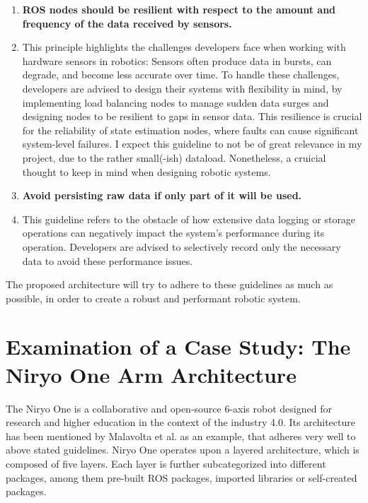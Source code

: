 \documentclass[%
paper=A4,               %
twoside=true,           %
openright,              %
11pt,                   %
bibliography=totoc,     %
titlepage=on,           %
DIV=12,                 %
BCOR=1.5cm,             %
parskip=half,            %
final
]{scrreprt}
\begin{document}
\begin{enumerate}[leftmargin=9mm, align=left]
		\item \textbf{ROS nodes should be resilient with respect to the amount and frequency of the data received by sensors.} 
		\item[] This principle highlights the challenges developers face when working with hardware sensors in robotics: Sensors often produce data in bursts, can degrade, and become less accurate over time. To handle these challenges, developers are advised to design their systems with flexibility in mind, by implementing load balancing nodes to manage sudden data surges and designing nodes to be resilient to gaps in sensor data. This resilience is crucial for the reliability of state estimation nodes, where faults can cause significant system-level failures. I expect this guideline to not be of great relevance in my project, due to the rather small(-ish) dataload. Nonetheless, a cruicial thought to keep in mind when designing robotic systems. \autocite{malavoltaHowYouArchitect2020}
		
		\item \textbf{Avoid persisting raw data if only part of it will be used.}
		\item[] This guideline refers to the obstacle of how extensive data logging or storage operations can negatively impact the system's performance during its operation. Developers are advised to selectively record only the necessary data to avoid these performance issues. \autocite{malavoltaHowYouArchitect2020}
		
		
	\end{enumerate}
	
	The proposed architecture will try to adhere to these guidelines as much as possible, in order to create a robust and performant robotic system.
	
	
	\section{Examination of a Case Study: The Niryo One Arm Architecture}
	The Niryo One is a collaborative and open-source 6-axis robot designed for research and higher education in the context of the industry 4.0.
	Its architecture has been mentioned by Malavolta et al. as an example, that adheres very well to above stated guidelines. \autocite{malavoltaHowYouArchitect2020} Niryo One operates upon a layered architecture, which is composed of five layers. Each layer is further subcategorized into different packages, among them pre-built ROS packages, imported libraries or self-created packages. \newline
	
\end{document}
